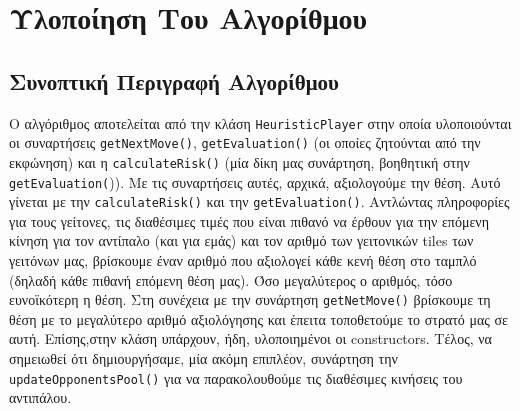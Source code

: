 \chapter{Υλοποίηση Του Αλγορίθμου}
\section{Συνοπτική Περιγραφή Αλγορίθμου}
\begin{sloppypar}
Ο αλγόριθμος αποτελείται από την κλάση \lstinline!HeuristicPlayer! στην οποία υλοποιούνται οι  
συναρτήσεις  \lstinline!getNextMove()!,
\lstinline!getEvaluation()! (οι οποίες ζητούνται από την εκφώνηση) και η 
\lstinline!calculateRisk()! (μία δίκη μας συνάρτηση, βοηθητική στην \lstinline!getEvaluation(!)).
Με τις συναρτήσεις αυτές, αρχικά, αξιολογούμε την θέση.
Αυτό γίνεται με την \lstinline!calculateRisk()! και την 
\lstinline!getEvaluation()!.
Αντλώντας πληροφορίες για τους γείτονες, τις διαθέσιμες τιμές που είναι 
πιθανό να έρθουν για την επόμενη κίνηση  για τον αντίπαλο (και για εμάς) και τον αριθμό 
των γειτονικών tiles των γειτόνων μας,
βρίσκουμε έναν αριθμό που αξιολογεί κάθε κενή θέση στο ταμπλό
(δηλαδή κάθε πιθανή επόμενη θέση μας).
Όσο μεγαλύτερος ο αριθμός, τόσο ευνοϊκότερη η θέση.
Στη συνέχεια με την συνάρτηση \lstinline!getNetMove()! βρίσκουμε τη 
θέση με το μεγαλύτερο αριθμό αξιολόγησης και έπειτα τοποθετούμε το στρατό μας σε αυτή.
Επίσης,στην κλάση υπάρχουν, ήδη, υλοποιημένοι οι constructors.
Τέλος, να σημειωθεί ότι δημιουργήσαμε, μία ακόμη επιπλέον, συνάρτηση την \lstinline!updateOpponentsPool()! για να 
παρακολουθούμε τις διαθέσιμες κινήσεις του αντιπάλου.
\end{sloppypar}